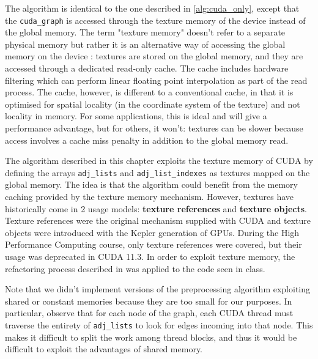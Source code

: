 \label{alg:cuda_texture}
The algorithm is identical to the one described in \ref{alg:cuda_only}, except that the \verb|cuda_graph| is accessed through the texture memory of the device instead of the global memory. The term "texture memory" doesn't refer to a separate physical memory but rather it is an alternative way of accessing the global memory on the device \cite{web:nvidia_doc_texture_mem}: textures are stored on the global memory, and they are accessed through a dedicated read-only cache. The cache includes hardware filtering which can perform linear floating point interpolation as part of the read process. The cache, however, is different to a conventional cache, in that it is optimised for spatial locality (in the coordinate system of the texture) and not locality in memory. For some applications, this is ideal and will give a performance advantage, but for others, it won't: textures can be slower because access involves a cache miss penalty in addition to the global memory read.

The algorithm described in this chapter exploits the texture memory of CUDA by defining the arrays \verb|adj_lists| and \verb|adj_list_indexes| as textures mapped on the global memory. The idea is that the algorithm could benefit from the memory caching provided by the texture memory mechanism. However, textures have historically come in 2 usage models: \textbf{texture references} and \textbf{texture objects}. Texture references were the original mechanism supplied with CUDA and texture objects were introduced with the Kepler generation of GPUs. During the High Performance Computing course, only texture references were covered, but their usage was deprecated in CUDA 11.3. In order to exploit texture memory, the refactoring process described in \cite{web:noauthor_cuda_2013} was applied to the code seen in class.

Note that we didn't implement versions of the preprocessing algorithm exploiting shared or constant memories because they are too small for our purposes. In particular, observe that for each node of the graph, each CUDA thread must traverse the entirety of \verb|adj_lists| to look for edges incoming into that node. This makes it difficult to split the work among thread blocks, and thus it would be difficult to exploit the advantages of shared memory.